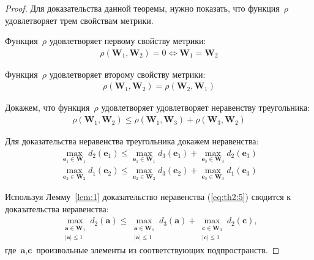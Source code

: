 \documentclass[12pt, twoside]{article}
\numberwithin{equation}{section}
\begin{document}
\begin{proof}
Для доказательства данной теоремы, нужно показать, что функция~$\rho$ удовлетворяет трем свойствам метрики.

Функция~$\rho$ удовлетворяет первому свойству метрики:
\begin{equation}
\label{eq:th2:2}
\begin{aligned}
\rho\left(\textbf{W}_1, \textbf{W}_2\right) = 0 \Leftrightarrow \textbf{W}_1 = \textbf{W}_2
\end{aligned}
\end{equation}

Функция~$\rho$ удовлетворяет второму свойству метрики:
\begin{equation}
\label{eq:th2:3}
\begin{aligned}
\rho\left(\textbf{W}_1, \textbf{W}_2\right) = \rho\left(\textbf{W}_2, \textbf{W}_1\right)
\end{aligned}
\end{equation}

Докажем, что функция~$\rho$ удовлетворяет удовлетворяет неравенству треугольника:
\begin{equation}
\label{eq:th2:4}
\begin{aligned}
\rho\left(\textbf{W}_1, \textbf{W}_2\right) \leq \rho\left(\textbf{W}_1, \textbf{W}_3\right) + \rho\left(\textbf{W}_3, \textbf{W}_2\right)
\end{aligned}
\end{equation}

Для доказательства неравенства треугольника докажем неравенства:
\begin{equation}
\label{eq:th2:5}
\begin{aligned}
\max_{\textbf{e}_1 \in \textbf{W}_1}d_{2}\left(\textbf{e}_1\right) \leq 
\max_{\textbf{e}_1\in \textbf{W}_1}d_{3}\left(\textbf{e}_1\right)+
\max_{\textbf{e}_3 \in \textbf{W}_3}d_{2}\left(\textbf{e}_3\right) \\
\max_{\textbf{e}_2 \in \textbf{W}_2}d_{1}\left(\textbf{e}_2\right) \leq 
\max_{\textbf{e}_2\in \textbf{W}_2}d_{3}\left(\textbf{e}_2\right)+
\max_{\textbf{e}_3 \in \textbf{W}_3}d_{1}\left(\textbf{e}_3\right)
\end{aligned}
\end{equation}

Используя Лемму~\ref{lem:1} доказательство неравенства (\ref{eq:th2:5}) сводится к доказательства неравенства:
\begin{equation}
\label{eq:th2:6}
\begin{aligned}
\max_{\substack{\textbf{a} \in \textbf{W}_1 \\ \left|\textbf{a}\right| \leq 1}}d_{2}\left(\textbf{a}\right) \leq 
\max_{\substack{\textbf{a} \in \textbf{W}_1 \\ \left|\textbf{a}\right| \leq 1}}d_{3}\left(\textbf{a}\right)+
\max_{\substack{\textbf{c} \in \textbf{W}_3 \\ \left|\textbf{c}\right| \leq 1}}d_{2}\left(\textbf{c}\right),
\end{aligned}
\end{equation}
где~$\textbf{a}, \textbf{c}$ произвольные элементы из соответствующих подпространств. 


\end{proof}
\end{document}
